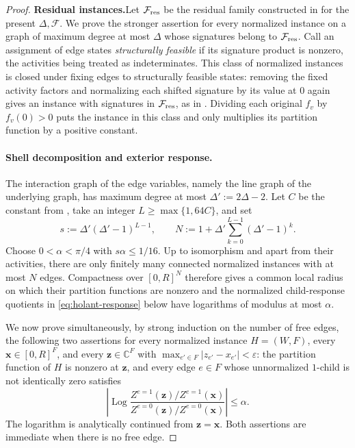 \documentclass[11pt,reqno]{article}
\theoremstyle{plain}
\theoremstyle{definition}
\theoremstyle{remark}
\theoremstyle{definition}
\theoremstyle{remark}
\newcommand{\C}{\mathbb{C}}
\newcommand{\eps}{\varepsilon}
\newcommand{\Log}{\operatorname{Log}}          %
\newcommand{\Deg}{\Delta}                        %
\begin{document}
\begin{proof}
\textbf{Residual instances.}\hspace{1em}Let \(\mathcal F_{\rm res}\) be the residual family constructed in
 for the present \(\Deg,\mathcal F\).
We prove the stronger assertion for every normalized instance on a graph
of maximum degree at most \(\Deg\) whose signatures belong to
\(\mathcal F_{\rm res}\).  Call an assignment of edge states
\emph{structurally feasible} if its signature product is nonzero, the
activities being treated as indeterminates.  This class of normalized
instances is closed under
fixing edges to structurally feasible states: removing the fixed
activity factors and normalizing each shifted signature by its value
at \(0\) again gives an instance with signatures in \(\mathcal F_{\rm res}\),
as in .
Dividing each original \(f_v\) by \(f_v(0)>0\) puts the instance in this
class and only multiplies its partition function by a positive constant.

\paragraph{Shell decomposition and exterior response.}
The interaction graph of the edge variables, namely the line graph of the
underlying graph, has maximum degree at most \(\Deg':=2\Deg-2\).  Let
\(C\) be the constant from , take an
integer \(L\ge\max\{1,64C\}\), and set
\[
  s:=\Deg'(\Deg'-1)^{L-1},
  \qquad
  N:=1+\Deg'\sum_{k=0}^{L-1}(\Deg'-1)^k.
\]
Choose \(0<\alpha<\pi/4\) with \(s\alpha\le1/16\).  Up to isomorphism
and apart from their activities, there are only finitely many connected
normalized instances with at most \(N\) edges.  Compactness over
\([0,R]^N\) therefore gives a common local radius on which their
partition functions are nonzero and the normalized child-response
quotients in \eqref{eq:holant-response} below have logarithms of modulus
at most \(\alpha\).

We now prove simultaneously, by strong induction on the number of free
edges, the following two assertions for every normalized instance
\(H=(W,F)\), every \(\mathbf x\in[0,R]^F\), and every \(\mathbf z\in\C^F\)
with \(\max_{e'\in F}|z_{e'}-x_{e'}|<\eps\): the partition function of
\(H\) is nonzero at \(\mathbf z\), and every edge \(e\in F\) whose
unnormalized \(1\)-child is not identically zero satisfies
\begin{equation}\label{eq:holant-response}
  \left|
  \Log
  \frac{Z^{e=1}(\mathbf z)/Z^{e=1}(\mathbf x)}
       {Z^{e=0}(\mathbf z)/Z^{e=0}(\mathbf x)}
  \right|\le\alpha.
\end{equation}
The logarithm is analytically continued from
\(\mathbf z=\mathbf x\).  Both assertions are immediate when there is no
free edge.


\end{proof}
\end{document}
